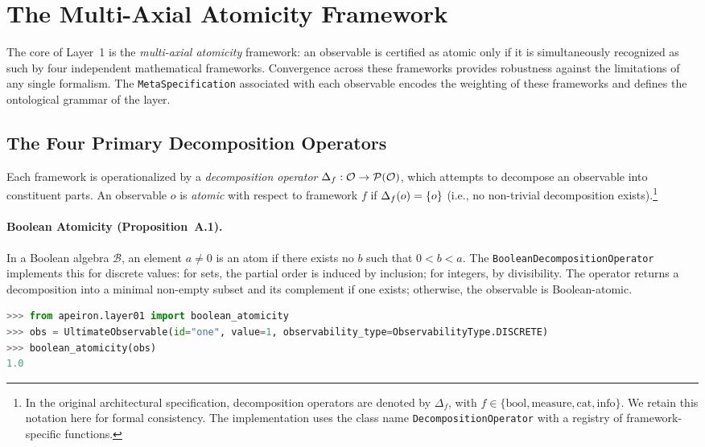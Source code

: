 \clearpage
\section{The Multi-Axial Atomicity Framework}
\label{sec:atomicity}

The core of Layer~1 is the \emph{multi-axial atomicity} framework: an observable is certified as atomic only if it is simultaneously recognized as such by four independent mathematical frameworks. Convergence across these frameworks provides robustness against the limitations of any single formalism. The \texttt{MetaSpecification} associated with each observable encodes the weighting of these frameworks and defines the ontological grammar of the layer.

\subsection{The Four Primary Decomposition Operators}

Each framework is operationalized by a \emph{decomposition operator} $\Delta_f: \mathcal{O} \to \mathcal{P}(\mathcal{O})$, which attempts to decompose an observable into constituent parts. An observable $o$ is \emph{atomic} with respect to framework $f$ if $\Delta_f(o) = \{o\}$ (i.e., no non-trivial decomposition exists).\footnote{In the original architectural specification, decomposition operators are denoted by $\Delta_f$, with $f \in \{\mathrm{bool}, \mathrm{measure}, \mathrm{cat}, \mathrm{info}\}$. We retain this notation here for formal consistency. The implementation uses the class name \texttt{DecompositionOperator} with a registry of framework-specific functions.}

\paragraph{Boolean Atomicity (Proposition~A.1).}
In a Boolean algebra $\mathcal{B}$, an element $a \neq 0$ is an atom if there exists no $b$ such that $0 < b < a$. The \texttt{BooleanDecompositionOperator} implements this for discrete values: for sets, the partial order is induced by inclusion; for integers, by divisibility. The operator returns a decomposition into a minimal non-empty subset and its complement if one exists; otherwise, the observable is Boolean-atomic.

\begin{lstlisting}[language=Python, caption={Boolean atomicity test for the integer 1}, label={lst:boolean}]
>>> from apeiron.layer01 import boolean_atomicity
>>> obs = UltimateObservable(id="one", value=1, observability_type=ObservabilityType.DISCRETE)
>>> boolean_atomicity(obs)
1.0
\end{lstlisting}

